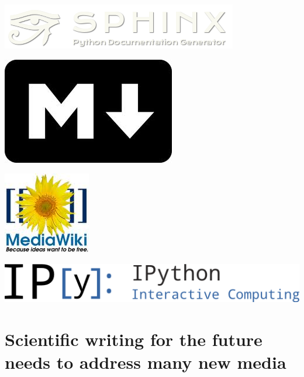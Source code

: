 \documentclass[%
oneside,                 %
final,                   %
chapterprefix=true,      %
open=right               %
10pt]{book}
\begin{document}

\begin{center}  %
  \centerline{\includegraphics[width=0.4\linewidth]{../doc/slides/fig/sphinx_logo.png}}
\end{center}



\begin{center}  %
  \centerline{\includegraphics[width=0.2\linewidth]{../doc/slides/fig/markdown_logo.jpg}}
\end{center}



\begin{center}  %
  \centerline{\includegraphics[width=0.2\linewidth]{../doc/slides/fig/MediaWiki_logo.jpg}}
\end{center}



\begin{center}  %
  \centerline{\includegraphics[width=0.6\linewidth]{../doc/slides/fig/IPython_logo.png}}
\end{center}



\section{Scientific writing for the future needs to address many new media}
\end{document}
